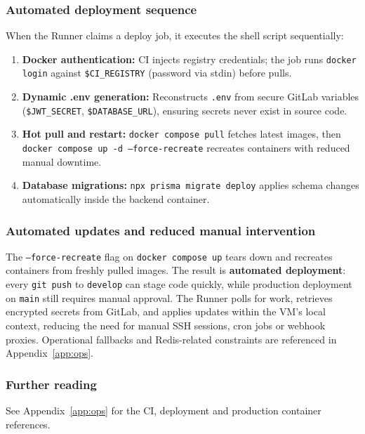 \documentclass[11pt,a4paper]{article}
\begin{document}
\subsubsection{Automated deployment sequence}

When the Runner claims a deploy job, it executes the shell script sequentially:

\begin{enumerate}
\item \textbf{Docker authentication:} CI injects registry credentials; the job runs \texttt{docker login} against \texttt{\$CI\_REGISTRY} (password via stdin) before pulls.
\item \textbf{Dynamic .env generation:} Reconstructs \texttt{.env} from secure GitLab variables (\texttt{\$JWT\_SECRET}, \texttt{\$DATABASE\_URL}), ensuring secrets never exist in source code.
\item \textbf{Hot pull and restart:} \texttt{docker compose pull} fetches latest images, then \texttt{docker compose up -d --force-recreate} recreates containers with reduced manual downtime.
\item \textbf{Database migrations:} \texttt{npx prisma migrate deploy} applies schema changes automatically inside the backend container.
\end{enumerate}

\subsubsection{Automated updates and reduced manual intervention}

The \texttt{--force-recreate} flag on \texttt{docker compose up} tears down and recreates containers from freshly pulled images. The result is \textbf{automated deployment}: every \texttt{git push} to \texttt{develop} can stage code quickly, while production deployment on \texttt{main} still requires manual approval. The Runner polls for work, retrieves encrypted secrets from GitLab, and applies updates within the VM's local context, reducing the need for manual SSH sessions, cron jobs or webhook proxies. Operational fallbacks and Redis-related constraints are referenced in Appendix~\ref{app:ops}.

\subsubsection{Further reading}

See Appendix~\ref{app:ops} for the CI, deployment and production container references.
\end{document}

